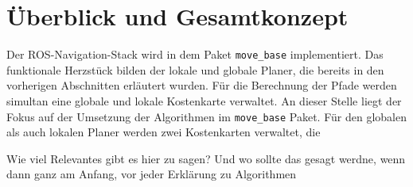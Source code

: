 \section{Überblick und Gesamtkonzept}
Der ROS-Navigation-Stack wird in dem Paket \lstinline{move_base}{} implementiert. Das funktionale Herzstück bilden der lokale und globale Planer, die bereits in den vorherigen Abschnitten erläutert wurden. Für die Berechnung der Pfade werden simultan eine globale und lokale Kostenkarte verwaltet. An dieser Stelle liegt der Fokus auf der Umsetzung der Algorithmen im  \lstinline{move_base}{} Paket. Für den globalen als auch lokalen Planer werden zwei Kostenkarten verwaltet, die

{ Wie viel Relevantes gibt es hier zu sagen? Und wo sollte das gesagt werdne, wenn dann ganz am Anfang, vor jeder Erklärung zu Algorithmen}